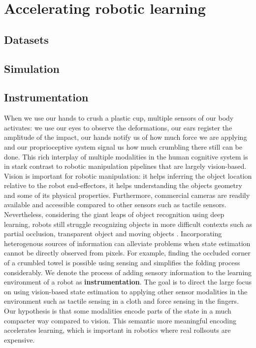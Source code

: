\documentclass[\home/main.tex]{subfiles}
\begin{document}
\section{Accelerating robotic learning}
\subsection{Datasets}
\subsection{Simulation}
\subsection{Instrumentation}
When we use our hands to crush a plastic cup, multiple sensors of our body activates: we use our eyes to observe the deformations, our ears register the amplitude of the impact, our hands notify us of how much force we are applying and our proprioceptive system signal us how much crumbling there still can be done. This rich interplay of multiple modalities in the human cognitive system is in stark contrast to robotic manipulation pipelines that are largely vision-based.  Vision is important for robotic manipulation: it helps inferring the object location relative to the robot end-effectors, it helps understanding the objects geometry and some of its physical properties. Furthermore, commercial cameras are readily available and accessible compared to other sensors such as tactile sensors. Nevertheless, considering the giant leaps of object recognition using deep learning, robots still struggle recognizing objects in more difficult contexts such as partial occlusion, transparent object and moving objects \autocite{Guo2014,sajjan2019cleargrasp,Ojha2015}. 
Incorporating heterogenous sources of information can alleviate problems when state estimation cannot be directly observed from pixels. For example, finding the occluded corner of a crumbled towel is possible using sensing and simplifies the folding process considerably. 
We denote the process of adding sensory information to the learning environment of a robot as \textbf{instrumentation}. The goal is to direct the large focus on using vision-based state estimation to applying other sensor modalities in the environment such as tactile sensing in a cloth and force sensing in the fingers. Our hypothesis is that some modalities encode parts of the state in a much compacter way compared to vision. This semantic more meaningful encoding accelerates learning, which is important in robotics where real rollsouts are expensive. 
\end{document}
